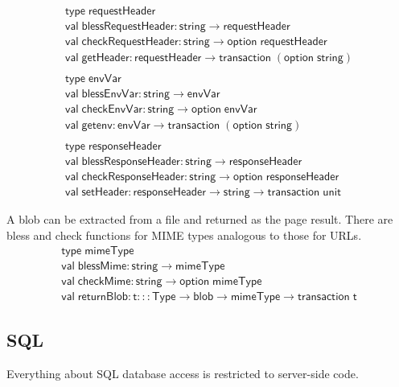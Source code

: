 \documentclass{article}
\newcommand{\mt}[1]{\mathsf{#1}}
\begin{document}
$$\begin{array}{l}
  \mt{type} \; \mt{requestHeader} \\
  \mt{val} \; \mt{blessRequestHeader} : \mt{string} \to \mt{requestHeader} \\
  \mt{val} \; \mt{checkRequestHeader} : \mt{string} \to \mt{option} \; \mt{requestHeader} \\
  \mt{val} \; \mt{getHeader} : \mt{requestHeader} \to \mt{transaction} \; (\mt{option} \; \mt{string}) \\
  \\
  \mt{type} \; \mt{envVar} \\
  \mt{val} \; \mt{blessEnvVar} : \mt{string} \to \mt{envVar} \\
  \mt{val} \; \mt{checkEnvVar} : \mt{string} \to \mt{option} \; \mt{envVar} \\
  \mt{val} \; \mt{getenv} : \mt{envVar} \to \mt{transaction} \; (\mt{option} \; \mt{string}) \\
  \\
  \mt{type} \; \mt{responseHeader} \\
  \mt{val} \; \mt{blessResponseHeader} : \mt{string} \to \mt{responseHeader} \\
  \mt{val} \; \mt{checkResponseHeader} : \mt{string} \to \mt{option} \; \mt{responseHeader} \\
  \mt{val} \; \mt{setHeader} : \mt{responseHeader} \to \mt{string} \to \mt{transaction} \; \mt{unit}
\end{array}$$

A blob can be extracted from a file and returned as the page result.  There are bless and check functions for MIME types analogous to those for URLs.
$$\begin{array}{l}
  \mt{type} \; \mt{mimeType} \\
  \mt{val} \; \mt{blessMime} : \mt{string} \to \mt{mimeType} \\
  \mt{val} \; \mt{checkMime} : \mt{string} \to \mt{option} \; \mt{mimeType} \\
  \mt{val} \; \mt{returnBlob} : \mt{t} ::: \mt{Type} \to \mt{blob} \to \mt{mimeType} \to \mt{transaction} \; \mt{t}
\end{array}$$


\subsection{SQL}

Everything about SQL database access is restricted to server-side code.
\end{document}
